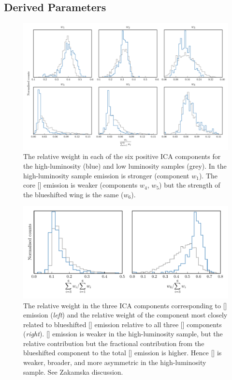 \subsection{Derived Parameters}

\begin{figure}
    \includegraphics[width=2\columnwidth]{figures/chapter04/mfica_component_weights.pdf} 
    \caption{The relative weight in each of the six positive ICA components for the high-luminosity (blue) and low luminosity samples (grey). In the high-luminosity sample  emission is stronger (component $w_1$). The core [] emission is weaker (components $w_4$, $w_5$) but the strength of the blueshifted wing is the same ($w_6$).}     
    \label{fig:mfica_component_weights}
\end{figure}

\begin{figure}
    \centering
    \includegraphics[width=1.5\columnwidth]{figures/chapter04/mfica_oiii_weight.pdf} 
    \caption{The relative weight in the three ICA components corresponding to [] emission ({\em left}) and the relative weight of the component most closely related to blueshifted [] emission relative to all three [] components ({\em right}). [] emission is weaker in the high-luminosity sample, but the relative contribution but the fractional contribution from the blueshifted component to the total [] emission is higher. Hence [] is weaker, broader, and more asymmetric in the high-luminosity sample. See Zakamska discussion.}     
    \label{fig:mfica_oiii_weight}
\end{figure}

